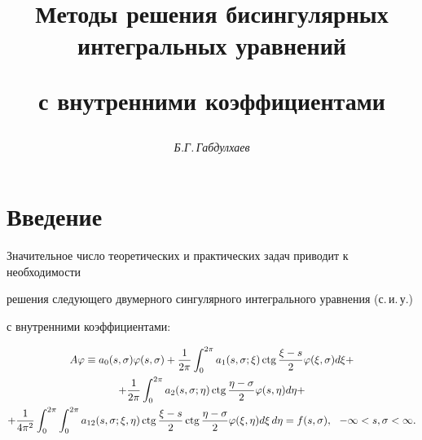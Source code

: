 








\author{\it Б.Г.\,Габдулхаев}




\title{Методы решения бисингулярных интегральных уравнений


с внутренними коэффициентами}





\date{}




\pagestyle{plain} %







\maketitle


\label{begin}











\section*{Введение}


\setcounter{section}{0}





Значительное число теоретических и практических задач приводит к необходимости 


решения следующего двумерного сингулярного интегрального уравнения (с.\,и.\,у.) 


с внутренними коэффициентами:


\begin{multline}


A\vp \equiv a_0(s,\si)\vp(s,\si)+\frac{1}{2\pi}\int_{0}^{2\pi}a_1(s,\si;\xi)


\ctg\frac{\xi-s}{2}\vp(\xi,\si)d\xi + \\


%


+\frac{1}{2\pi}\int_{0}^{2\pi}a_2(s,\sigma;\eta)


\ctg \frac{\eta-\sigma}{2}\vp(s,\eta)d\eta + \\


%


+\frac{1}{4\pi^2}\int_0^{2\pi}\int_0^{2\pi}


a_{12}(s,\sigma;\xi,\eta)\ctg\frac{\xi-s}{2}


\ctg\frac{\eta-\sigma}{2}\vp(\xi,\eta)d\xi\,d\eta=


f(s,\si),\ \ -\infty<s,\sigma<\infty.


\end{multline}


